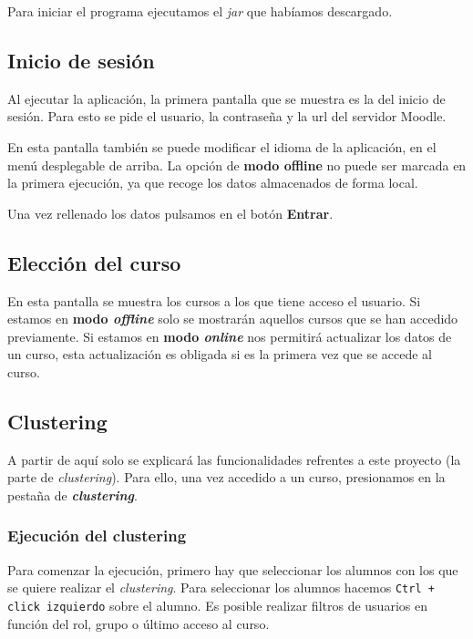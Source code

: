 Para iniciar el programa ejecutamos el \emph{jar} que habíamos descargado.

\subsection{Inicio de sesión}
Al ejecutar la aplicación, la primera pantalla que se muestra es la del inicio de sesión. Para esto se pide el usuario, la contraseña y la url del servidor Moodle.


En esta pantalla también se puede modificar el idioma de la aplicación, en el menú desplegable de arriba. La opción de \textbf{modo offline} no puede ser marcada en la primera ejecución, ya que recoge los datos almacenados de forma local.

Una vez rellenado los datos pulsamos en el botón \textbf{Entrar}.

\subsection{Elección del curso}
En esta pantalla se muestra los cursos a los que tiene acceso el usuario. Si estamos en \textbf{modo \emph{offline}} solo se mostrarán aquellos cursos que se han accedido previamente. Si estamos en \textbf{modo \emph{online}} nos permitirá actualizar los datos de un curso, esta actualización es obligada si es la primera vez que se accede al curso.


\subsection{Clustering}
A partir de aquí solo se explicará las funcionalidades refrentes a este proyecto (la parte de \emph{clustering}). Para ello, una vez accedido a un curso, presionamos en la pestaña de \textbf{\emph{clustering}}.

\subsubsection{Ejecución del clustering} \label{sssection:ejecutar}
Para comenzar la ejecución, primero hay que seleccionar los alumnos con los que se quiere realizar el \emph{clustering}. Para seleccionar los alumnos hacemos \texttt{Ctrl + click izquierdo} sobre el alumno. Es posible realizar filtros de usuarios en función del rol, grupo o último acceso al curso.

